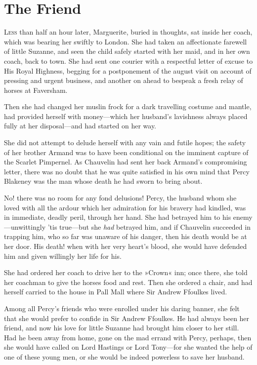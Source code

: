 

\chapter{The Friend}
\lettrine[lines=4]{L}{ess} than half an hour later, Marguerite, buried in thoughts, sat inside her coach, which was bearing her swiftly to London. She had taken an affectionate farewell of little Suzanne, and seen the child safely started with her maid, and in her own coach, back to town. She had sent one courier with a respectful letter of excuse to His Royal Highness, begging for a postponement of the august visit on account of pressing and urgent business, and another on ahead to bespeak a fresh relay of horses at Faversham.

Then she had changed her muslin frock for a dark travelling costume and mantle, had provided herself with money\allowbreak---\allowbreak which her husband's lavishness always placed fully at her disposal\allowbreak---\allowbreak and had started on her way.

She did not attempt to delude herself with any vain and futile hopes; the safety of her brother Armand was to have been conditional on the imminent capture of the Scarlet Pimpernel. As Chauvelin had sent her back Armand's compromising letter, there was no doubt that he was quite satisfied in his own mind that Percy Blakeney was the man whose death he had sworn to bring about.

No! there was no room for any fond delusions! Percy, the husband whom she loved with all the ardour which her admiration for his bravery had kindled, was in immediate, deadly peril, through her hand. She had betrayed him to his enemy\allowbreak---\allowbreak unwittingly 'tis true\allowbreak---\allowbreak but she \textit{had} betrayed him, and if Chauvelin succeeded in trapping him, who so far was unaware of his danger, then his death would be at her door. His death! when with her very heart's blood, she would have defended him and given willingly her life for his.

She had ordered her coach to drive her to the »Crown« inn; once there, she told her coachman to give the horses food and rest. Then she ordered a chair, and had herself carried to the house in Pall Mall where Sir Andrew Ffoulkes lived.

Among all Percy's friends who were enrolled under his daring banner, she felt that she would prefer to confide in Sir Andrew Ffoulkes. He had always been her friend, and now his love for little Suzanne had brought him closer to her still. Had he been away from home, gone on the mad errand with Percy, perhaps, then she would have called on Lord Hastings or Lord Tony\allowbreak---\allowbreak for she wanted the help of one of these young men, or she would be indeed powerless to save her husband.

